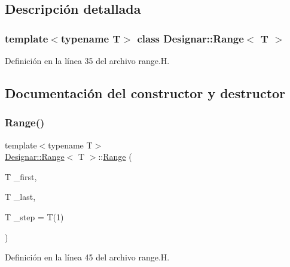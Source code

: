 \subsection{Descripción detallada}
\subsubsection*{template$<$typename T$>$\newline
class Designar\+::\+Range$<$ T $>$}



Definición en la línea 35 del archivo range.\+H.



\subsection{Documentación del constructor y destructor}
\mbox{\label{class_designar_1_1_range_a45c16ed23ea9052133bd8bd1ef3542b1}} 
\subsubsection{\texorpdfstring{Range()}{Range()}\hspace{0.1cm}{\footnotesize\ttfamily [1/2]}}
{\footnotesize\ttfamily template$<$typename T$>$ \\
\hyperlink{class_designar_1_1_range}{Designar\+::\+Range}$<$ T $>$\+::\hyperlink{class_designar_1_1_range}{Range} (\begin{DoxyParamCaption}\item[{T}]{\+\_\+first,  }\item[{T}]{\+\_\+last,  }\item[{T}]{\+\_\+step = {\ttfamily T(1)} }\end{DoxyParamCaption})\hspace{0.3cm}{\ttfamily [inline]}}



Definición en la línea 45 del archivo range.\+H.

\mbox{\label{class_designar_1_1_range_a2a6163d6685fc38f387c36a33ce91578}} 
